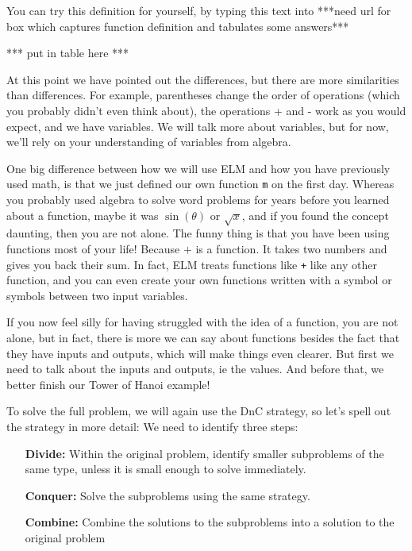 \documentclass[12pt]{amsbook}
\newcommand{\elm}[1]{\texttt{#1}}
\begin{document}
You can try this definition for yourself, by typing this text into ***need url for box which captures function definition and tabulates some answers***

*** put in table here ***

At this point we have pointed out the differences, but there are more similarities than differences.  For example, parentheses change the order of operations (which you probably didn't even think about), the operations + and - work as you would expect, and we have variables.  We will talk more about variables, but for now, we'll rely on your understanding of variables from algebra.

One big difference between how we will use ELM and how you have previously used math, is that we just defined our own function \elm{m} on the first day.  Whereas you probably used algebra to solve word problems for years before you learned about a function, maybe it was $\sin(\theta)$ or $\sqrt{x}$, and if you found the concept daunting, then you are not alone.  The funny thing is that you have been using functions most of your life!  Because $+$ is a function.  It takes two numbers and gives you back their sum.  In fact, ELM treats functions like \elm{+} like any other function, and you can even create your own functions written with a symbol or symbols between two input variables.

If you now feel silly for having struggled with the idea of a function, you are not alone, but in fact, there is more we can say about functions besides the fact that they have inputs and outputs, which will make things even clearer.  But first we need to talk about the inputs and outputs, ie the values.  And before that, we better finish our Tower of Hanoi example!

To solve the full problem, we will again use the DnC strategy, so let's spell out the strategy in more detail:  We need to identify three steps:

\begin{itemize}
\item[\textbf{Divide:}]  Within the original problem, identify smaller subproblems of the same type, unless it is small enough to solve immediately.
\item[\textbf{Conquer:}]  Solve the subproblems using the same strategy.
\item[\textbf{Combine:}]  Combine the solutions to the subproblems into a solution to the original problem
\end{itemize}
\end{document}
